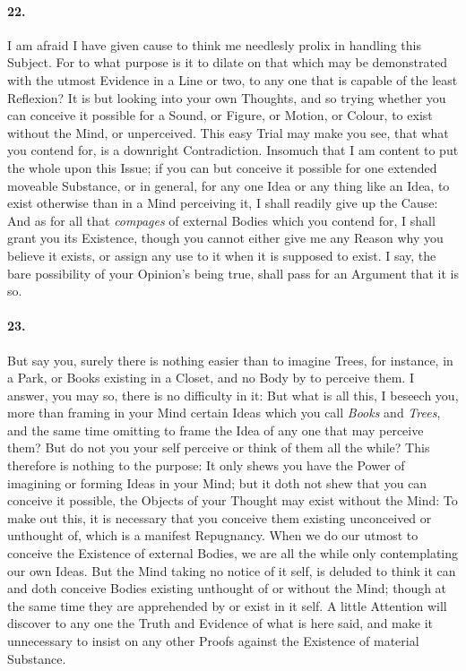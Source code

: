 \documentclass[]{article}
\newenvironment{sectionbody}{\begin{multicols}{2}}{\end{multicols}}
\begin{document}
\begin{sectionbody}
\paragraph{22.} I am afraid I have given cause to think me needlesly prolix in
handling this Subject.  For to what purpose is it to dilate on
that which may be demonstrated with the utmost Evidence in a Line
or two, to any one that is capable of the least Reflexion? It is
but looking into your own Thoughts, and so trying whether you can
conceive it possible for a Sound, or Figure, or Motion, or
Colour, to exist without the Mind, or unperceived.  This easy
Trial may make you see, that what you contend for, is a downright
Contradiction.  Insomuch that I am content to put the whole upon
this Issue; if you can but conceive it possible for one extended
moveable Substance, or in general, for any one Idea or any thing
like an Idea, to exist otherwise than in a Mind perceiving it, I
shall readily give up the Cause: And as for all that
\emph{compages} of external Bodies which you contend for, I
shall grant you its Existence, though you cannot either give me
any Reason why you believe it exists, or assign any use to it
when it is supposed to exist.  I say, the bare possibility of
your Opinion's being true, shall pass for an Argument that it is
so.



\paragraph{23.} But say you, surely there is nothing easier than to imagine
Trees, for instance, in a Park, or Books existing in a Closet,
and no Body by to perceive them.  I answer, you may so, there is
no difficulty in it: But what is all this, I beseech you, more
than framing in your Mind certain Ideas which you call
\emph{Books} and \emph{Trees}, and the same time omitting to
frame the Idea of any one that may perceive them? But do not you
your self perceive or think of them all the while?  This
therefore is nothing to the purpose: It only shews you have the
Power of imagining or forming Ideas in your Mind; but it doth not
shew that you can conceive it possible, the Objects of your
Thought may exist without the Mind: To make out this, it is
necessary that you conceive them existing unconceived or
unthought of, which is a manifest Repugnancy.  When we do our
utmost to conceive the Existence of external Bodies, we are all
the while only contemplating our own Ideas.  But the Mind taking
no notice of it self, is deluded to think it can and doth
conceive Bodies existing unthought of or without the Mind; though
at the same time they are apprehended by or exist in it self.  A
little Attention will discover to any one the Truth and Evidence
of what is here said, and make it unnecessary to insist on any
other Proofs against the Existence of material Substance.




\end{sectionbody}
\end{document}

